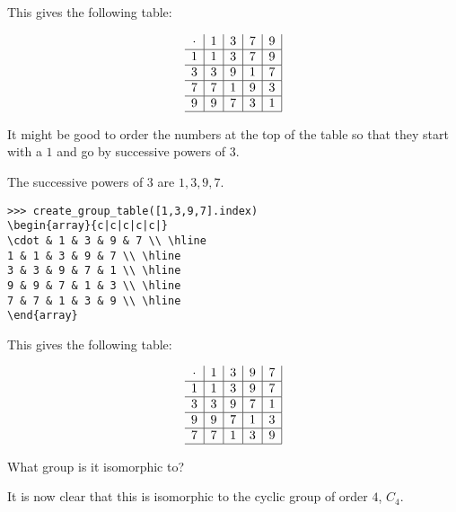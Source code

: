 \documentclass[../gatm_answers.tex]{subfiles}
\begin{document}
This gives the following table:

$$\begin{array}{c|c|c|c|c|}
\cdot & 1 & 3 & 7 & 9 \\ \hline
1 & 1 & 3 & 7 & 9 \\ \hline
3 & 3 & 9 & 1 & 7 \\ \hline
7 & 7 & 1 & 9 & 3 \\ \hline
9 & 9 & 7 & 3 & 1 \\ \hline
\end{array}$$

\begin{inner_problem}
\item It might be good to order the numbers at the top of the table so that they start with a $1$ and go by successive powers of $3$.
\end{inner_problem}

The successive powers of $3$ are $1,3,9,7$.

\begin{verbatim}
>>> create_group_table([1,3,9,7].index)
\begin{array}{c|c|c|c|c|}
\cdot & 1 & 3 & 9 & 7 \\ \hline
1 & 1 & 3 & 9 & 7 \\ \hline
3 & 3 & 9 & 7 & 1 \\ \hline
9 & 9 & 7 & 1 & 3 \\ \hline
7 & 7 & 1 & 3 & 9 \\ \hline
\end{array}
\end{verbatim}

This gives the following table:

$$\begin{array}{c|c|c|c|c|}
\cdot & 1 & 3 & 9 & 7 \\ \hline
1 & 1 & 3 & 9 & 7 \\ \hline
3 & 3 & 9 & 7 & 1 \\ \hline
9 & 9 & 7 & 1 & 3 \\ \hline
7 & 7 & 1 & 3 & 9 \\ \hline
\end{array}$$

\begin{inner_problem}
\item What group is it isomorphic to?
\end{inner_problem}

It is now clear that this is isomorphic to the cyclic group of order $4$, $C_4$.
\end{document}
